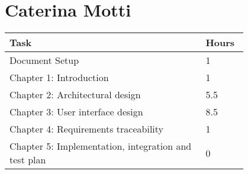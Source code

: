 \section{Caterina Motti}
\begin{center}
	\begin{tabular}{@{}p{0.7\linewidth} p{0.1\linewidth}@{}}
		\hline
		\textbf{Task} & \textbf{Hours} \\ \hline
            Document Setup & 1 \\ \hline
            Chapter 1: Introduction & 1 \\ \hline
            Chapter 2: Architectural design & 5.5 \\ \hline
            Chapter 3: User interface design & 8.5 \\ \hline
            Chapter 4: Requirements traceability & 1 \\ \hline
            Chapter 5: Implementation, integration and test plan & 0 \\ \hline
	\end{tabular}
\end{center}
